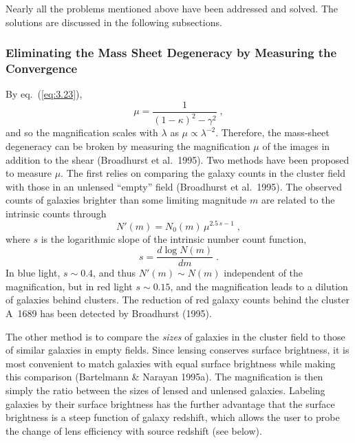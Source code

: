 \documentclass[a4paper,10pt]{article} %
\begin{document}
Nearly all the problems mentioned above have been addressed and
solved. The solutions are discussed in the following subsections.

\subsubsection{Eliminating the Mass Sheet Degeneracy by Measuring the
Convergence}
\label{NB:subsubsect4.2.3}

By eq.\ (\ref{eq:3.23}),
\begin{equation}
  \mu = \frac{1}{(1-\kappa)^2-\gamma^2}\;,
\label{eq:4.19}
\end{equation}
and so the magnification scales with $\lambda$ as
$\mu\propto\lambda^{-2}$. Therefore, the mass-sheet degeneracy can be
broken by measuring the magnification $\mu$ of the images in addition
to the shear (Broadhurst et al.\ 1995). Two methods have been proposed
to measure $\mu$. The first relies on comparing the galaxy counts in
the cluster field with those in an unlensed ``empty'' field
(Broadhurst et al.\ 1995). The observed counts of galaxies brighter
than some limiting magnitude $m$ are related to the intrinsic counts
through
\begin{equation}
  N'(m) = N_0(m)\,\mu^{2.5\,s-1}\;,
\label{eq:4.20}
\end{equation}
where $s$ is the logarithmic slope of the intrinsic number count
function,
\begin{equation}
  s = \frac{d\log N(m)}{dm}\;.
\label{eq:4.21}
\end{equation}
In blue light, $s\sim0.4$, and thus $N'(m)\sim N(m)$ independent of
the magnification, but in red light $s\sim0.15$, and the magnification
leads to a dilution of galaxies behind clusters. The reduction of red
galaxy counts behind the cluster A~1689 has been detected by
Broadhurst (1995).

The other method is to compare the {\em sizes\/} of galaxies in the
cluster field to those of similar galaxies in empty fields. Since
lensing conserves surface brightness, it is most convenient to match
galaxies with equal surface brightness while making this comparison
(Bartelmann \& Narayan 1995a). The magnification is then simply the
ratio between the sizes of lensed and unlensed galaxies. Labeling
galaxies by their surface brightness has the further advantage that
the surface brightness is a steep function of galaxy redshift, which
allows the user to probe the change of lens efficiency with source
redshift (see below).
\end{document}
